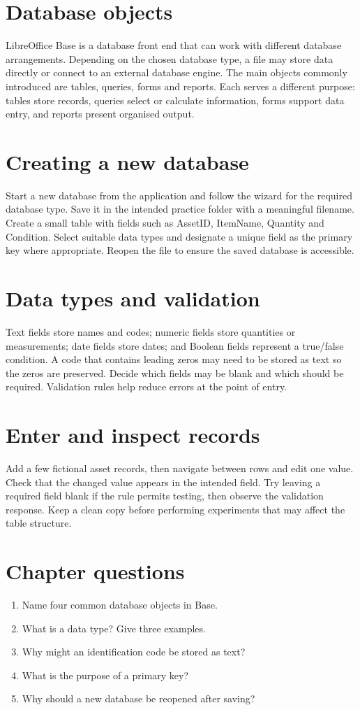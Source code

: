 \documentclass[11pt,openany,oneside]{book}
\begin{document}
\section{Database objects}
LibreOffice Base is a database front end that can work with different database arrangements. Depending on the chosen database type, a file may store data directly or connect to an external database engine. The main objects commonly introduced are tables, queries, forms and reports. Each serves a different purpose: tables store records, queries select or calculate information, forms support data entry, and reports present organised output.
\section{Creating a new database}
Start a new database from the application and follow the wizard for the required database type. Save it in the intended practice folder with a meaningful filename. Create a small table with fields such as AssetID, ItemName, Quantity and Condition. Select suitable data types and designate a unique field as the primary key where appropriate. Reopen the file to ensure the saved database is accessible.
\section{Data types and validation}
Text fields store names and codes; numeric fields store quantities or measurements; date fields store dates; and Boolean fields represent a true/false condition. A code that contains leading zeros may need to be stored as text so the zeros are preserved. Decide which fields may be blank and which should be required. Validation rules help reduce errors at the point of entry.
\section{Enter and inspect records}
Add a few fictional asset records, then navigate between rows and edit one value. Check that the changed value appears in the intended field. Try leaving a required field blank if the rule permits testing, then observe the validation response. Keep a clean copy before performing experiments that may affect the table structure.
\section{Chapter questions}
\begin{enumerate}\item Name four common database objects in Base.\item What is a data type? Give three examples.\item Why might an identification code be stored as text?\item What is the purpose of a primary key?\item Why should a new database be reopened after saving?\end{enumerate}
\end{document}
